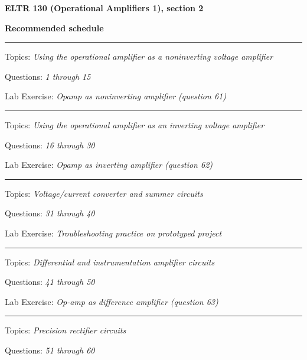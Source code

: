 \vskip 10pt




\vfil \eject

\centerline{\bf ELTR 130 (Operational Amplifiers 1), section 2} \bigskip 
 
\vskip 10pt

\noindent
{\bf Recommended schedule}

\vskip 5pt

\hrule \vskip 5pt
\noindent
{}

\hskip 10pt Topics: {\it Using the operational amplifier as a noninverting voltage amplifier}
 
\hskip 10pt Questions: {\it 1 through 15}
 
\hskip 10pt Lab Exercise: {\it Opamp as noninverting amplifier (question 61)}
 

\vskip 10pt
\hrule \vskip 5pt
\noindent
{}

\hskip 10pt Topics: {\it Using the operational amplifier as an inverting voltage amplifier}
 
\hskip 10pt Questions: {\it 16 through 30}
 
\hskip 10pt Lab Exercise: {\it Opamp as inverting amplifier (question 62)}
 
 
\vskip 10pt
\hrule \vskip 5pt
\noindent
{}

\hskip 10pt Topics: {\it Voltage/current converter and summer circuits}
 
\hskip 10pt Questions: {\it 31 through 40}
 
\hskip 10pt Lab Exercise: {\it Troubleshooting practice on prototyped project}
 
\vskip 10pt
\hrule \vskip 5pt
\noindent
{}

\hskip 10pt Topics: {\it Differential and instrumentation amplifier circuits}
 
\hskip 10pt Questions: {\it 41 through 50}
 
\hskip 10pt Lab Exercise: {\it Op-amp as difference amplifier (question 63)}
 
\vskip 10pt
\hrule \vskip 5pt
\noindent
{}

\hskip 10pt Topics: {\it Precision rectifier circuits}
 
\hskip 10pt Questions: {\it 51 through 60}
 
